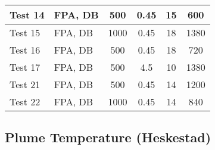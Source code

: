 \begin{table}[!h]
\begin{center}
\begin{tabular}{|l|l|c|c|c|c|}
Test 14    &  FPA, DB           &  500            &  0.45           &  15                &  600             \\ \hline
Test 15    &  FPA, DB           &  1000           &  0.45           &  18                &  1380            \\ \hline
Test 16    &  FPA, DB           &  500            &  0.45           &  18                &  720             \\ \hline
Test 17    &  FPA, DB           &  500            &  4.5            &  10                &  1380            \\ \hline
Test 21    &  FPA, DB           &  500            &  0.45           &  14                &  1200            \\ \hline
Test 22    &  FPA, DB           &  1000           &  0.45           &  14                &  840             \\ \hline
\end{tabular}
\end{center}
\end{table}


\clearpage


\subsection*{Plume Temperature (Heskestad)}


